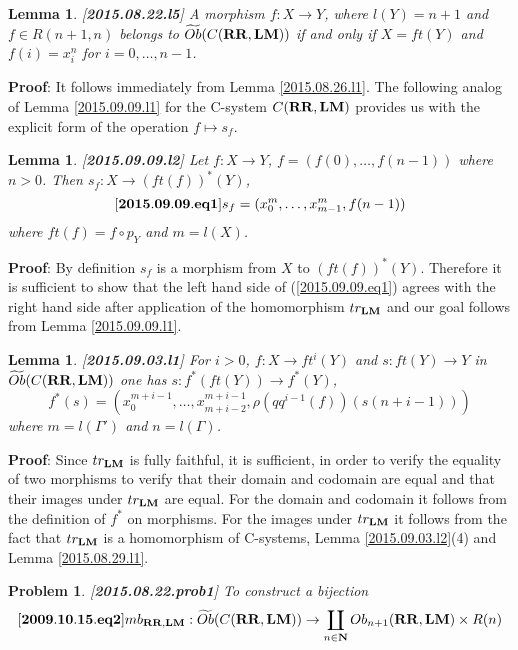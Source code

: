 \documentclass[11pt]{article}
\newenvironment{eq}{\begin{equation}}{\end{equation}}
\newenvironment{proof}{{\bf Proof}:}{\vskip 5mm }
\newtheorem{lemma}[proposition]{Lemma}
\newtheorem{problem}[proposition]{Problem}
\newcommand{\llabel}[1]{\label{#1}[{\bf #1}]}
\newcommand{\sr}{\rightarrow}
\newcommand{\nn}{{\bf N\rm}}
\newcommand{\nat}{\nn}
\newcommand{\wt}{\widetilde}
\newcommand{\mbind}{\rho}
\newcommand{\RR}{{\bf RR}}
\newcommand{\LM}{{\bf LM}}
\begin{document}
%
\begin{lemma}
\llabel{2015.08.22.l5}
A morphism $f:X\sr Y$, where $l(Y)=n+1$ and $f\in R(n+1,n)$ belongs to $\wt{Ob}(C(\RR,\LM))$ if and only if $X=ft(Y)$ and $f(i)=x^n_i$ for $i=0,\dots,n-1$. 
\end{lemma}
%
\begin{proof}
It follows immediately from Lemma \ref{2015.08.26.l1}.
\end{proof}
%
The following analog of Lemma \ref{2015.09.09.l1} for the C-system $C(\RR,\LM)$ provides us with the explicit form of the operation $f\mapsto s_f$.
%
\begin{lemma}
\llabel{2015.09.09.l2}
Let $f:X\sr Y$, $f=(f(0),\dots,f(n-1))$ where $n>0$. Then $s_f:X\sr (ft(f))^*(Y)$,
%
\begin{eq}\llabel{2015.09.09.eq1}
s_f=(x_0^{m},\dots,x_{m-1}^{m},f(n-1))
\end{eq}
%
where $ft(f)=f\circ p_Y$ and $m=l(X)$. 
\end{lemma}
%
\begin{proof}
By definition $s_f$ is a morphism from $X$ to $(ft(f))^*(Y)$. Therefore it is sufficient to show that the left hand side of (\ref{2015.09.09.eq1}) agrees with the right hand side after application of the homomorphism $tr_{\LM}$ and our goal follows from Lemma \ref{2015.09.09.l1}.
\end{proof}
%
\begin{lemma}
\llabel{2015.09.03.l1}
For $i>0$, $f:X\sr ft^i(Y)$ and $s:ft(Y)\sr Y$ in $\wt{Ob}(C(\RR,\LM))$ one has $s:f^*(ft(Y))\sr f^*(Y)$,
%
$$f^*(s)=(x_0^{m+i-1},\dots,x_{m+i-2}^{m+i-1},\mbind(qq^{i-1}(f))(s(n+i-1)))$$
%
where $m=l(\Gamma')$ and $n=l(\Gamma)$.
\end{lemma}
%
\begin{proof}
Since $tr_{\LM}$ is fully faithful, it is sufficient, in order to verify the equality of two morphisms to verify that their domain and codomain are equal and that their images under $tr_{\LM}$ are equal. For the domain and codomain it follows from the definition of $f^*$ on morphisms. For the images under $tr_{\LM}$ it follows from the fact that $tr_{\LM}$ is a homomorphism of C-systems, Lemma \ref{2015.09.03.l2}(4) and
Lemma \ref{2015.08.29.l1}. 
\end{proof}
%
\begin{problem}
\llabel{2015.08.22.prob1}
To construct a bijection
%
\begin{eq}
\llabel{2009.10.15.eq2}
mb_{\RR,\LM}:\wt{Ob}(C(\RR,\LM))\sr \coprod_{n\in\nat} Ob_{n+1}(\RR,\LM)\times R(n)
\end{eq}
%
\end{problem}
\end{document}
